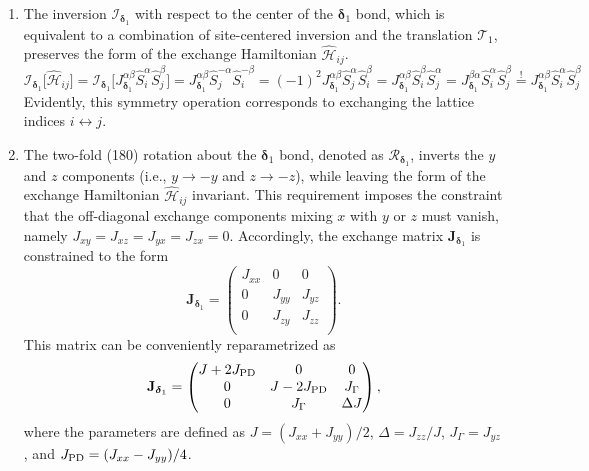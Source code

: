 \documentclass[aps, prx, nofootinbib, preprintnumbers, superscriptaddress]{revtex4-2}
\begin{document}
\begin{enumerate}[label=(\roman*)]
    \item The inversion $\mathcal{I}_{\boldsymbol\delta_{1}}$ with respect to the center of the $\boldsymbol\delta_{1}$ bond, which is equivalent to a combination of site-centered inversion and the translation $\mathcal{T}_{1}$, preserves the form of the exchange Hamiltonian $\hat{\mathcal{H}}_{ij}$.
    \begin{equation}
        \mathcal{I}_{\boldsymbol\delta_{1}} \big[ \hat{\mathcal{H}}_{ij} \big] 
        = \mathcal{I}_{\boldsymbol\delta_{1}} \big[ J_{\boldsymbol\delta_{1}}^{\alpha\beta} \hat{S}_{i}^{\alpha} \hat{S}_{j}^{\beta} \big]
        = J_{\boldsymbol\delta_{1}}^{\alpha\beta} \hat{S}^{-\alpha}_{j} \hat{S}^{-\beta}_{i}
        = (-1)^{2} J_{\boldsymbol\delta_{1}}^{\alpha\beta} \hat{S}^{\alpha}_{j} \hat{S}^{\beta}_{i}
        = J_{\boldsymbol\delta_{1}}^{\alpha\beta} \hat{S}^{\beta}_{i} \hat{S}^{\alpha}_{j}
        = J_{\boldsymbol\delta_{1}}^{\beta\alpha} \hat{S}^{\alpha}_{i} \hat{S}^{\beta}_{j}
        \overset{!}{=} J_{\boldsymbol\delta_{1}}^{\alpha\beta} \hat{S}^{\alpha}_{i} \hat{S}^{\beta}_{j}
    \end{equation}
    Evidently, this symmetry operation corresponds to exchanging the lattice indices $i \leftrightarrow j$.


    \item The two-fold (180\textdegree) rotation about the $\boldsymbol\delta_1$ bond, denoted as $\mathcal{R}_{\boldsymbol\delta_{1}}$, inverts the $y$ and $z$ components (i.e., $y \to -y$ and $z \to -z$), while leaving the form of the exchange Hamiltonian $\hat{\mathcal{H}}_{ij}$ invariant. This requirement imposes the constraint that the off-diagonal exchange components mixing $x$ with $y$ or $z$ must vanish, namely $J_{xy} = J_{xz} = J_{yx} = J_{zx} = 0$.
    Accordingly, the exchange matrix $\mathbf{J}_{\boldsymbol\delta_{1}}$ is constrained to the form
    \begin{equation}
        \mathbf{J}_{\boldsymbol\delta_{1}} =
        \begin{pmatrix}
            J_{xx} &   0    &   0    \\
              0    & J_{yy} & J_{yz} \\
              0    & J_{zy} & J_{zz} \\
        \end{pmatrix}.
    \end{equation}
    This matrix can be conveniently reparametrized as
    \begin{equation}
        \mathbf{J}_{\boldsymbol\delta_{1}} =
        \begin{pmatrix}
            J + 2 J_{\rm PD} &   0              &   0           \\
              0              & J - 2 J_{\rm PD} & J_{\Gamma}    \\
              0              & J_{\Gamma}       & \Delta J      \\
        \end{pmatrix},
    \end{equation}
    where the parameters are defined as $J = (J_{xx} + J_{yy})/2$, $\Delta = J_{zz}/J$, $J_{\Gamma} = J_{yz}$, and $J_{\rm PD} = (J_{xx} - J_{yy})/4$.


\end{enumerate}
\end{document}
